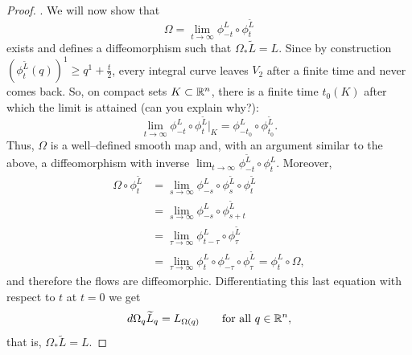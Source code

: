 \begin{proof}
	. We will now show that
	\begin{equation}
		\Omega = \lim_{t\to\infty} \phi_{-t}^L \circ \phi_t^{\widetilde{L}}
	\end{equation}
	exists and defines a diffeomorphism such that $\Omega_* \widetilde{L} = L$.
	Since by construction $(\phi_t^{\widetilde{L}}(q))^1 \geq q^1 + \frac t2$, every integral curve leaves $V_2$ after a finite time and never comes back.
	So, on compact sets $K\subset\mathbb{R}^n$, there is a finite time $t_0(K)$ after which the limit is attained (can you explain why?):
	\begin{equation}
		\lim_{t\to\infty} \phi_{-t}^L \circ \phi_t^{\widetilde{L}}\Big|_K = \phi_{-t_0}^L \circ \phi_{t_0}^{\widetilde{L}}.
	\end{equation}
	Thus, $\Omega$ is a well--defined smooth map and, with an argument similar to the above, a diffeomorphism with inverse $\lim_{t\to\infty} \phi_{-t}^{\widetilde{L}} \circ \phi_t^L$.
	Moreover,
	\begin{align}
		\Omega \circ \phi^{\widetilde{L}}_t & = \lim_{s\to\infty} \phi_{-s}^L \circ \phi^{\widetilde{L}}_s \circ \phi^{\widetilde{L}}_t                     \\
		                                    & = \lim_{s\to\infty} \phi_{-s}^L \circ \phi^{\widetilde{L}}_{s+t}                                              \\
		                                    & = \lim_{\tau\to\infty} \phi_{t-\tau}^L \circ \phi^{\widetilde{L}}_\tau                                        \\
		                                    & = \lim_{\tau\to\infty} \phi_{t}^L \circ \phi_{-\tau}^L \circ \phi^{\widetilde{L}}_\tau = \phi_t^L \circ \Omega,
	\end{align}
	and therefore the flows are diffeomorphic.
	Differentiating this last equation with respect to $t$ at $t=0$ we get
	\begin{equation}
		d\Omega_q \widetilde{L}_q = L_{\Omega(q)} \qquad \mbox{for all } q\in\mathbb{R}^n,
	\end{equation}
	that is, $\Omega_*\widetilde{L} = L$.
\end{proof}

